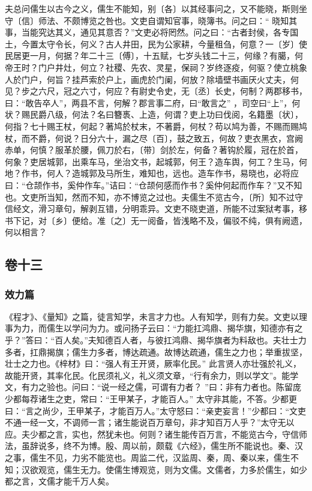 \documentclass[]{article}
\begin{document}
夫总问儒生以古今之义，儒生不能知，别〔各〕以其经事问之，又不能晓，斯则坐守〔信〕师法、不颇博览之咎也。文吏自谓知官事，晓簿书。问之曰：``
晓知其事，当能究达其义，通见其意否？''文吏必将罔然。问之曰：``古者封侯，各专国土，今置太守令长，何义？古人井田，民为公家耕，今量租刍，何意？一〔岁〕使民居更一月，何据？年二十三〔傅〕，十五赋，七岁头钱二十三，何缘？有臈，何帝王时？门户井灶，何立？社稷、先农、灵星，保祠？岁终逐疫，何驱？使立桃象人於门户，何旨？挂芦索於户上，画虎於门阑，何放？除墙壁书画厌火丈夫，何见？步之六尺，冠之六寸，何应？有尉史令史，无〔丞〕长史，何制？两郡移书，曰：``敢告卒人''，两县不言，何解？郡言事二府，曰``敢言之''
，司空曰``上''，何状？赐民爵八级，何法？名曰簪褭、上造，何谓？吏上功曰伐阅，名籍墨〔状〕，何指？七十赐王杖，何起？著鸠於杖末，不著爵，何杖？苟以鸠为善，不赐而赐鸠杖，而不爵，何说？日分六十，漏之尽〔百〕，鼓之致五，何故？吏衣黑衣，宫阙赤单，何慎？服革於腰，佩刀於右，〔带〕剑於左，何备？著钩於履，冠在於首，何象？吏居城郭，出乘车马，坐治文书，起城郭，何王？造车舆，何工？生马，何地？作书，何人？造城郭及马所生，难知也，远也。造车作书，易晓也，必将应曰：``仓颉作书，奚仲作车。''诘曰：``仓颉何感而作书？奚仲何起而作车？''又不知也。文吏所当知，然而不知，亦不博览之过也。夫儒生不览古今，〔所〕知不过守信经文，滑习章句，解剥互错，分明乖异。文吏不晓吏道，所能不过案狱考事，移书下记，对〔乡〕便给。准〔之〕无一阅备，皆浅略不及，偏驳不纯，俱有阙遗，何以相言？

\hypertarget{header-n553}{%
\subsection{卷十三}\label{header-n553}}

\hypertarget{header-n554}{%
\subsubsection{效力篇}\label{header-n554}}

《程才》、《量知》之篇，徒言知学，未言才力也。人有知学，则有力矣。文吏以理事为力，而儒生以学问为力。或问扬子云曰：``力能扛鸿鼎、揭华旗，知德亦有之乎？''答曰：``百人矣。''夫知德百人者，与彼扛鸿鼎、揭华旗者为料敌也。夫壮士力多者，扛鼎揭旗；儒生力多者，博达疏通。故博达疏通，儒生之力也；举重拔坚，壮士之力也。《梓材》曰：``强人有王开贤，厥率化民。''
此言贤人亦壮强於礼义，故能开贤，其率化民。化民须礼义，礼义须文章，``行有余力，则以学文''。能学文，有力之验也。问曰：``说一经之儒，可谓有力者？
''曰：非有力者也。陈留庞少都每荐诸生之吏，常曰：``王甲某子，才能百人。''
太守非其能，不答。少都更曰：``言之尚少，王甲某子，才能百万人。''太守怒曰：``亲吏妄言！''少都曰：``文吏不通一经一文，不调师一言；诸生能说百万章句，非才知百万人乎？''太守无以应。夫少都之言，实也，然犹未也。何则？诸生能传百万言，不能览古今，守信师法，虽辞说多，终不为博。殷、周以前，颇载《六经》，儒生所不能说也。秦、汉之事，儒生不见，力劣不能览也。周监二代，汉监周、秦，周、秦以来，儒生不知；汉欲观览，儒生无力。使儒生博观览，则为文儒。文儒者，力多於儒生，如少都之言，文儒才能千万人矣。
\end{document}
